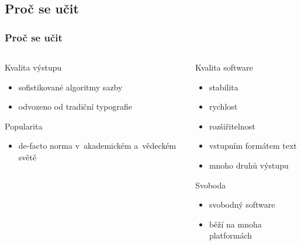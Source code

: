 \subsection{Proč se učit }
\begin{frame}
	\frametitle{Proč se učit }
	\begin{columns}[t]
		\begin{column}{0.45\textwidth}
			\begin{block}{Kvalita výstupu}
				\begin{itemize}
					\item sofistikované algoritmy sazby
					\item odvozeno od tradiční typografie
				\end{itemize}
			\end{block}
			\begin{block}{Popularita}
				\begin{itemize}
					\item de-facto norma v~akademickém a~vědeckém světě
				\end{itemize}
			\end{block}
		\end{column}
		\begin{column}{0.48\textwidth}
			\begin{block}{Kvalita software}
				\begin{itemize}
					\item stabilita
					\item rychlost
					\item rozšiřitelnost
					\item vstupním formátem text
					\item mnoho druhů výstupu
				\end{itemize}
			\end{block}
			\begin{block}{Svoboda}
				\begin{itemize}
					\item svobodný software
					\item běží na mnoha platformách
				\end{itemize}
			\end{block}
		\end{column}
	\end{columns}
\end{frame}


